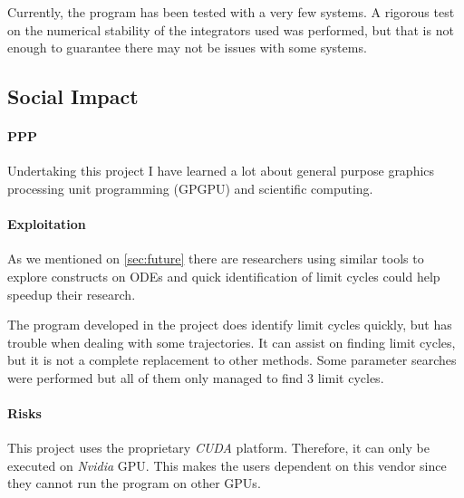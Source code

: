 Currently, the program has been tested with a very few systems. A rigorous test on the
numerical stability of the integrators used was performed, but that is not enough to
guarantee there may not be issues with some systems.


\subsection{Social Impact}

\paragraph{PPP}

Undertaking this project I have learned a lot about general purpose graphics
processing unit programming (GPGPU) and scientific computing.

\paragraph{Exploitation}

As we mentioned on \cref{sec:future} there are researchers using similar tools
to explore constructs on ODEs and quick identification of limit cycles could
help speedup their research.

The program developed in the project does identify limit cycles quickly, but has trouble
when dealing with some trajectories. It can assist on finding limit cycles, but it is not
a complete replacement to other methods. Some parameter searches were performed but all of
them only managed to find 3 limit cycles.

\paragraph{Risks}

This project uses the proprietary \emph{CUDA} platform. Therefore, it can only be executed
on \emph{Nvidia} GPU. This makes the users dependent on this vendor since they cannot
run the program on other GPUs.
